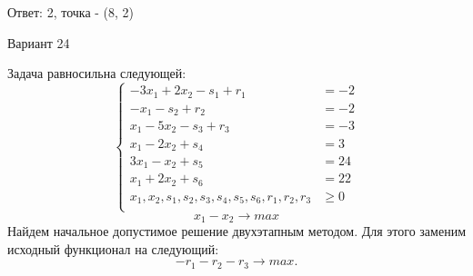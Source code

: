 \documentclass{article}%
\begin{document}
\begin{flushright}%
Ответ: 2, точка {-} (8, 2)%
\end{flushright}%
\newpage%
\begin{center}%
\begin{Huge}%
Вариант 24%
\end{Huge}%
\end{center}%
Задача равносильна следующей: %
\[%
\left\{\begin{aligned}-3x_{1}+2x_{2}-s_{1}+r_{1} & =-2 \\-x_{1}-s_{2}+r_{2} & =-2 \\x_{1}-5x_{2}-s_{3}+r_{3} & =-3 \\x_{1}-2x_{2}+s_{4} & =3 \\3x_{1}-x_{2}+s_{5} & =24 \\x_{1}+2x_{2}+s_{6} & =22 \\x_{1},x_{2},s_{1},s_{2},s_{3},s_{4},s_{5},s_{6},r_{1},r_{2},r_{3} & \ge 0 \\ \end{aligned}\right.%
\]%
\[%
x_{1}-x_{2}  \to max%
\]%
Найдем начальное допустимое решение двухэтапным методом. Для этого заменим исходный функционал на следующий: %
\[%
-r_{1}-r_{2}-r_{3}\to max.%
\]%
\end{document}
